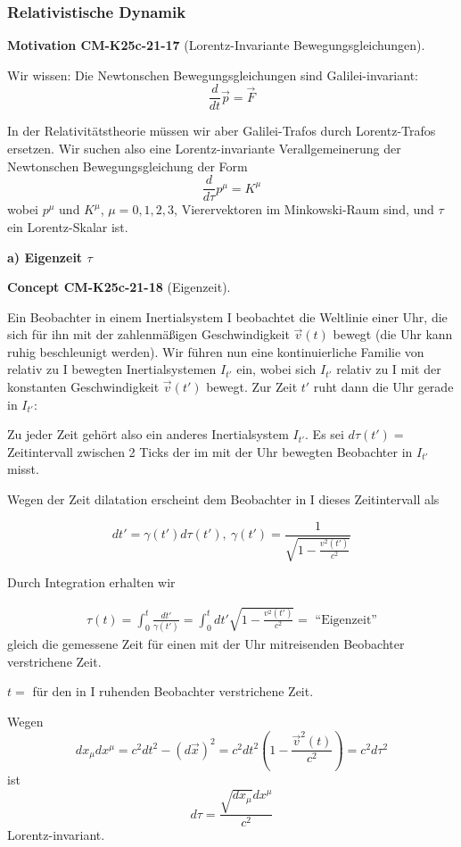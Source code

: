 \documentclass[10pt, letterpaper]{article}
\newcommand{\CustomHeading}[3]{%
  \par\medskip\noindent%
  \textbf{#1 #2} \textnormal{(#3)}.\enskip%
}
\newenvironment{CONC}[2]{\begin{unitbox}\CustomHeading{Concept}{#1}{#2}}{\end{unitbox}}
\newenvironment{MOT}[2]{\begin{unitbox}\CustomHeading{Motivation}{#1}{#2}}{\end{unitbox}}
\begin{document}
\pagebreak

\subsubsection*{Relativistische Dynamik}

\begin{MOT}{CM-K25c-21-17}{Lorentz-Invariante Bewegungsgleichungen}
Wir wissen: Die Newtonschen Bewegungsgleichungen sind Galilei-invariant:
\[\frac{d}{dt}\vec{p} = \vec{F}\]

In der Relativitätstheorie müssen wir aber Galilei-Trafos durch Lorentz-Trafos ersetzen. Wir suchen also eine Lorentz-invariante Verallgemeinerung der Newtonschen Bewegungsgleichung der Form
\[\frac{d}{d\tau}p^\mu = K^\mu\]
wobei $p^\mu$ und $K^\mu$, $\mu=0,1,2,3$, Vierervektoren im Minkowski-Raum sind, und $\tau$ ein Lorentz-Skalar ist.
\end{MOT}

\textbf{a) Eigenzeit $\tau$}

\begin{CONC}{CM-K25c-21-18}{Eigenzeit}
Ein Beobachter in einem Inertialsystem I beobachtet die Weltlinie einer Uhr, die sich für ihn mit der zahlenmäßigen Geschwindigkeit $\vec{v}(t)$ bewegt (die Uhr kann ruhig beschleunigt werden). Wir führen nun eine kontinuierliche Familie von relativ zu I bewegten Inertialsystemen $I_{t'}$ ein, wobei sich $I_{t'}$ relativ zu I mit der konstanten Geschwindigkeit $\vec{v}(t')$ bewegt. Zur Zeit $t'$ ruht dann die Uhr gerade in $I_{t'}$:


Zu jeder Zeit gehört also ein anderes Inertialsystem $I_{t'}$.
Es sei $d\tau(t') = $ Zeitintervall zwischen 2 Ticks der im mit der Uhr bewegten Beobachter in $I_{t'}$ misst.

Wegen der Zeit dilatation erscheint dem Beobachter in I dieses Zeitintervall als

$$dt' = \gamma(t') d\tau(t'),\ \gamma(t') = \frac{1}{\sqrt{1-\frac{v^2(t')}{c^2}}}$$

Durch Integration erhalten wir

\begin{align*}
\tau(t) = \int_0^t \frac{dt'}{\gamma(t')} = \int_0^t dt' \sqrt{1-\frac{v^2(t')}{c^2}} = \text{ ``Eigenzeit''}
\end{align*}
gleich die gemessene Zeit für einen mit der Uhr mitreisenden Beobachter verstrichene Zeit.

$t = $ für den in I ruhenden Beobachter verstrichene Zeit.

Wegen 
$$dx_\mu dx^\mu = c^2dt^2 -(d\vec{x})^2 = c^2 dt^2(1-\frac{\vec{v}^2(t)}{c^2}) = c^2 d\tau^2$$
ist 
$$d\tau = \frac{\sqrt{dx_\mu} dx^\mu}{c^2}$$ 
Lorentz-invariant.
\end{CONC}
\end{document}
